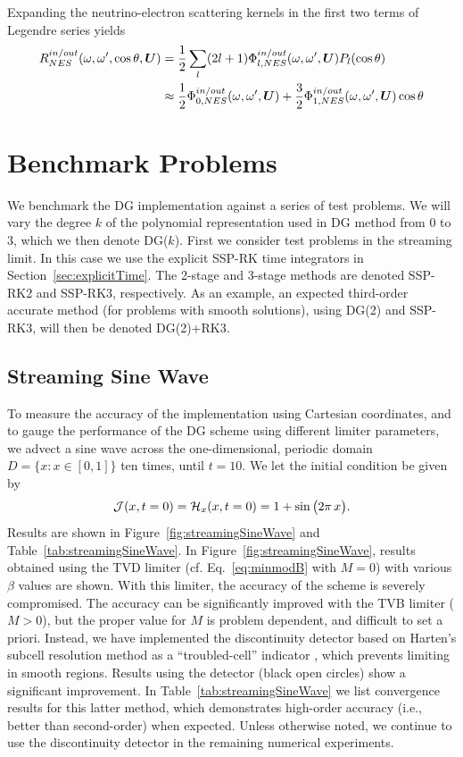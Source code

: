 \documentclass[10pt,preprint]{aastex}
\begin{document}
Expanding the neutrino-electron scattering kernels in the first two terms of Legendre series yields
\begin{align}
R^{in/out}_{NES}(\omega, \omega^{\prime}, \cos\theta, \boldsymbol{U}) & = \dfrac{1}{2} \sum_{l} (2l+1)\Phi^{in/out}_{l,NES}(\omega,\omega^{\prime},\boldsymbol{U})P_l(\cos\theta) \\
& \approx \dfrac{1}{2}\Phi_{0,NES}^{in/out}(\omega,\omega^{\prime}, \boldsymbol{U}) + \dfrac{3}{2}\Phi^{in/out}_{1,NES}(\omega,\omega^{\prime}, \boldsymbol{U})\cos\theta
\end{align}

\section{Benchmark Problems}

We benchmark the DG implementation against a series of test problems.  
We will vary the degree $k$ of the polynomial representation used in DG method from 0 to 3, which we then denote DG($k$).  
First we consider test problems in the streaming limit.  
In this case we use the explicit SSP-RK time integrators in Section~\ref{sec:explicitTime}.  
The 2-stage and 3-stage methods are denoted SSP-RK2 and SSP-RK3, respectively.  
As an example, an expected third-order accurate method (for problems with smooth solutions), using DG(2) and SSP-RK3, will then be denoted DG(2)+RK3.  

\subsection{Streaming Sine Wave}

To measure the accuracy of the implementation using Cartesian coordinates, and to gauge the performance of the DG scheme using different limiter parameters, we advect a sine wave across the one-dimensional, periodic domain $D=\{x:x\in[0,1]\}$ ten times, until $t=10$.  
We let the initial condition be given by
\begin{equation}
  \mathcal{J}(x,t=0)=\mathcal{H}_{x}(x,t=0)=1+\sin\big(2\pi\,x\big).  
\end{equation}
Results are shown in Figure~\ref{fig:streamingSineWave} and Table~\ref{tab:streamingSineWave}.  
In Figure~\ref{fig:streamingSineWave}, results obtained using the TVD limiter (cf. Eq.~\eqref{eq:minmodB} with $M=0$) with various $\beta$ values are shown.  
With this limiter, the accuracy of the scheme is severely compromised.  
The accuracy can be significantly improved with the TVB limiter ($M>0$), but the proper value for $M$ is problem dependent, and difficult to set a priori.  
Instead, we have implemented the discontinuity detector based on Harten's subcell resolution method as a ``troubled-cell'' indicator \citep{harten_1989,qiuShu_2005}, which prevents limiting in smooth regions.  
Results using the detector (black open circles) show a significant improvement.  
In Table~\ref{tab:streamingSineWave} we list convergence results for this latter method, which demonstrates high-order accuracy (i.e., better than second-order) when expected.  
Unless otherwise noted, we continue to use the discontinuity detector in the remaining numerical experiments.  
\end{document}
